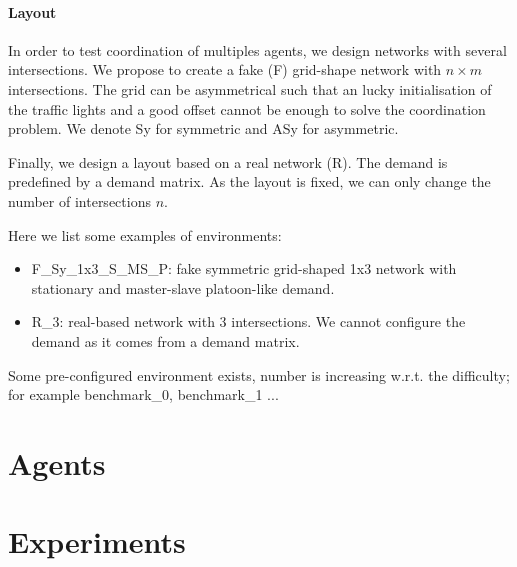 \documentclass{article}
\begin{document}
    \paragraph{Layout}
    
    In order to test coordination of multiples agents, we design networks with several intersections. We propose to create a fake (F) grid-shape network with $n \times m$ intersections. The grid can be asymmetrical such that an lucky initialisation of the traffic lights and a good offset cannot be enough to solve the coordination problem. We denote Sy for symmetric and ASy for asymmetric.
    
    Finally, we design a layout based on a real network (R). The demand is predefined by a demand matrix. As the layout is fixed, we can only change the number of intersections $n$.
    
    Here we list some examples of environments:
    
    \begin{itemize}
        \item F\_Sy\_1x3\_S\_MS\_P: fake symmetric grid-shaped 1x3 network with stationary and master-slave platoon-like demand.
        \item R\_3: real-based network with 3 intersections. We cannot configure the demand as it comes from a demand matrix.
    \end{itemize}
    
    Some pre-configured environment exists, number is increasing w.r.t. the difficulty; for example benchmark\_0, benchmark\_1 ...
    
    

\section{Agents}

\section{Experiments}

\end{document}
